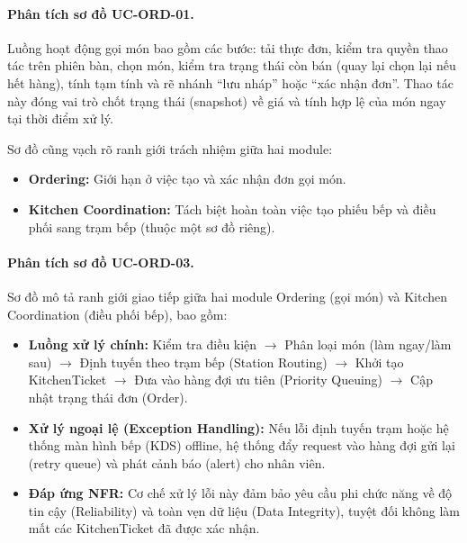
\paragraph{Phân tích sơ đồ UC-ORD-01.}
Luồng hoạt động gọi món bao gồm các bước: tải thực đơn, kiểm tra quyền thao tác trên phiên bàn, chọn món, kiểm tra trạng thái còn bán (quay lại chọn lại nếu hết hàng), tính tạm tính và rẽ nhánh \enquote{lưu nháp} hoặc \enquote{xác nhận đơn}. Thao tác này đóng vai trò chốt trạng thái (snapshot) về giá và tính hợp lệ của món ngay tại thời điểm xử lý.

Sơ đồ cũng vạch rõ ranh giới trách nhiệm giữa hai module:
\begin{itemize}
    \item \textbf{\textsf{Ordering}:} Giới hạn ở việc tạo và xác nhận đơn gọi món.
    \item \textbf{\textsf{Kitchen Coordination}:} Tách biệt hoàn toàn việc tạo phiếu bếp và điều phối sang trạm bếp (thuộc một sơ đồ riêng).
\end{itemize}


\paragraph{Phân tích sơ đồ UC-ORD-03.}
Sơ đồ mô tả ranh giới giao tiếp giữa hai module \textsf{Ordering} (gọi món) và \textsf{Kitchen Coordination} (điều phối bếp), bao gồm:

\begin{itemize}
    \item \textbf{Luồng xử lý chính:} Kiểm tra điều kiện $\rightarrow$ Phân loại món (làm ngay/làm sau) $\rightarrow$ Định tuyến theo trạm bếp (Station Routing) $\rightarrow$ Khởi tạo \textsf{KitchenTicket} $\rightarrow$ Đưa vào hàng đợi ưu tiên (Priority Queuing) $\rightarrow$ Cập nhật trạng thái đơn (\textsf{Order}).
    \item \textbf{Xử lý ngoại lệ (Exception Handling):} Nếu lỗi định tuyến trạm hoặc hệ thống màn hình bếp (KDS) offline, hệ thống đẩy request vào hàng đợi gửi lại (retry queue) và phát cảnh báo (alert) cho nhân viên. 
    \item \textbf{Đáp ứng NFR:} Cơ chế xử lý lỗi này đảm bảo yêu cầu phi chức năng về độ tin cậy (Reliability) và toàn vẹn dữ liệu (Data Integrity), tuyệt đối không làm mất các \textsf{KitchenTicket} đã được xác nhận.
\end{itemize}

